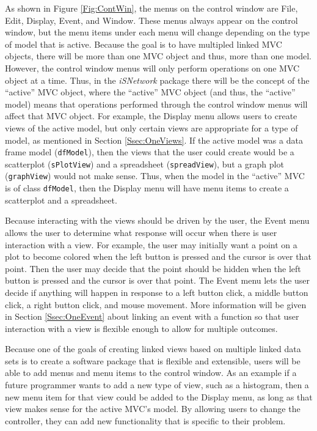 \documentclass{article}[11pt]
\newcommand{\Robject}[1]{{\texttt{#1}}}
\newcommand{\Rpackage}[1]{{\textit{#1}}}
\begin{document}
As shown in Figure \ref{Fig:ContWin}, the menus on the control window are
File, Edit, Display, Event, and Window.  These menus always appear on the
control window, but the menu items under each menu will change depending on
the type of model that is active.  Because the goal is to have multipled
linked MVC objects, there will be more than one MVC object and thus, more than
one model. However, the control window menus will only perform operations on
one MVC object at a time.  Thus, in the \Rpackage{iSNetwork} package there
will be the concept of the ``active'' MVC object, where the ``active'' MVC
object (and thus, the ``active'' model) means that operations performed
through the control window menus will affect that MVC object.  For example,
the Display menu allows users to create views of the active model, but only
certain views are appropriate for a type of model, as mentioned in Section
\ref{Ssec:OneViews}.  If the active model was a data frame model
(\Robject{dfModel}), then the views that the user could create would be a
scatterplot (\Robject{sPlotView}) and a spreadsheet (\Robject{spreadView}),
but a graph plot (\Robject{graphView}) would not make sense.  Thus, when the
model in the ``active'' MVC is of class \Robject{dfModel}, then the Display
menu will have menu items to create a scatterplot and a spreadsheet.

Because interacting with the views should be driven by the user,
the Event menu allows the user to determine what response will occur when
there is user interaction with a view.  For example, the user may initially
want a point on a plot to become colored when the left button is pressed and
the cursor is over that point.  Then the user may decide that the point
should be hidden when the left button is pressed and the cursor is over that
point.  The Event menu lets the user decide if anything will happen in
response to a left button click, a middle button click, a right button click,
and mouse movement.  More information will be given in Section
\ref{Ssec:OneEvent} about linking an event with a function so that user
interaction with a view is flexible enough to allow for multiple outcomes.

Because one of the goals of creating linked views based on multiple linked
data sets is to create a software package that is flexible and extensible,
users will be able to add menus and menu items to the control window.  As an
example if a future programmer wants to add a new type of view, such as a
histogram, then a new menu item for that view could be added to the Display
menu, as long as that view makes sense for the active MVC's model.  By
allowing users to change the controller, they can add new functionality that
is specific to their problem.  
\end{document}
